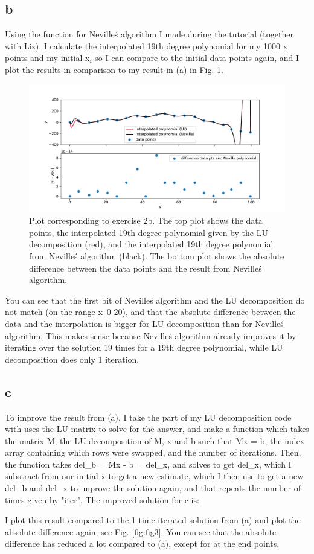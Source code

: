 \subsection{b}
Using the function for Neville\'s algorithm I made during the tutorial (together with Liz), I calculate the interpolated 19th degree polynomial for my 1000 x points and my initial x$_i$ so I can compare to the initial data points again, and I plot the results in comparison to my result in (a) in Fig. \ref{fig:fig2}.

\begin{figure}[h!]
  \centering
  \includegraphics[width=0.9\linewidth]{NUR1_Q2_plot2.pdf}
  \caption{Plot corresponding to exercise 2b. The top plot shows the data points, the interpolated 19th degree polynomial given by the LU decomposition (red), and the interpolated 19th degree polynomial from Neville\'s algorithm (black). The bottom plot shows the absolute difference between
  the data points and the result from Neville\'s algorithm.}
  \label{fig:fig2}
\end{figure} 

You can see that the first bit of Neville\'s algorithm and the LU decomposition do not match (on the range x~0-20), and that the absolute difference between the data and the interpolation is bigger for LU decomposition than for Neville\'s algorithm. 
This makes sense because Neville\'s algorithm already improves it by iterating over the solution 19 times for a 19th degree polynomial, while LU decomposition does only 1 iteration. 


\subsection{c}
To improve the result from (a), I take the part of my LU decomposition code with uses the LU matrix to solve for the answer, and make a function which takes the matrix M, the LU decomposition of M, x and b such that Mx = b, the index array containing which rows were swapped, and the number of iterations.
Then, the function takes del\_b = Mx - b = del\_x, and solves to get del\_x, which I substract from our initial x to get a new estimate, which I then use to get a new del\_b and del\_x to improve the solution again, and that repeats the number of times given by "iter". 
The improved solution for c is: 

I plot this result compared to the 1 time iterated solution from (a) and plot the absolute difference again, see Fig. \ref{fig:fig3}. You can see that the absolute difference has reduced a lot compared to (a), except for at the end points.

